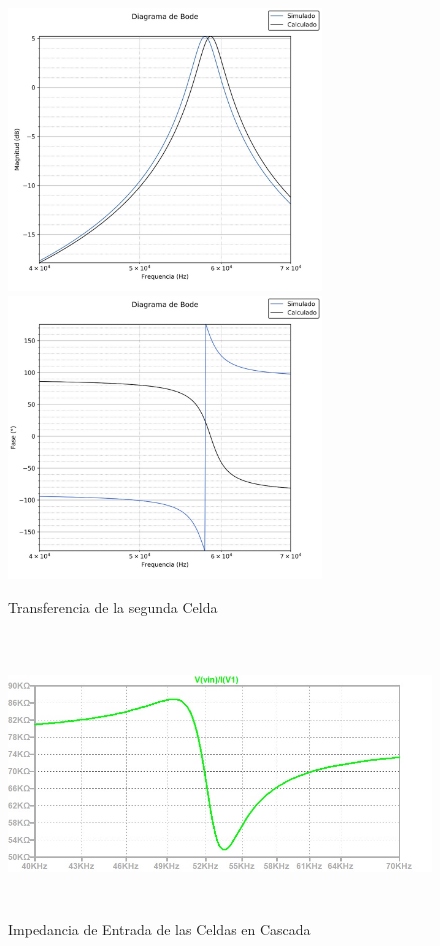 \begin{figure}[ht]
\begin{center}
\includegraphics[height=7.5cm]{../Ex2/Informe/TransferenciaCell2.jpeg}
\includegraphics[height=7.5cm]{../Ex2/Informe/FaseCell2.jpeg}
\caption{Transferencia de la segunda Celda}
\label{fig:e2 H cell2}
\end{center}
\end{figure}

\begin{figure}[ht]
\begin{center}
\includegraphics[height=7.5cm]{../Ex2/Informe/Zin.jpg}
\caption{Impedancia de Entrada de las Celdas en Cascada}
\label{fig:e2 Z total}
\end{center}
\end{figure}

